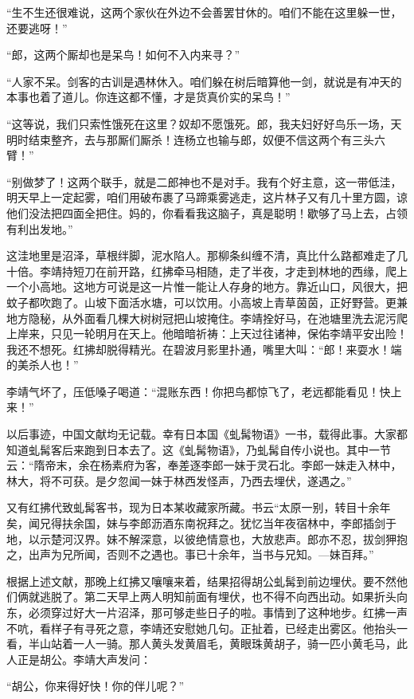 “生不生还很难说，这两个家伙在外边不会善罢甘休的。咱们不能在这里躲一世，还要逃呀！”

“郎，这两个厮却也是呆鸟！如何不入内来寻？”

“人家不呆。剑客的古训是遇林休入。咱们躲在树后暗算他一剑，就说是有冲天的本事也着了道儿。你连这都不懂，才是货真价实的呆鸟！”

“这等说，我们只索性饿死在这里？奴却不愿饿死。郎，我夫妇好好鸟乐一场，天明时结束整齐，去与那厮们厮杀！连杨立也输与郎，奴便不信这两个有三头六臂！”

“别做梦了！这两个联手，就是二郎神也不是对手。我有个好主意，这一带低洼，明天早上一定起雾，咱们用破布裹了马蹄乘雾逃走，这片林子又有几十里方圆，谅他们没法把四面全把住。妈的，你看看我这脑子，真是聪明！歇够了马上去，占领有利出发地。”

这洼地里是沼泽，草根绊脚，泥水陷人。那柳条纠缠不清，真比什么路都难走了几十倍。李靖持短刀在前开路，红拂牵马相随，走了半夜，才走到林地的西缘，爬上一个小高地。这地方可说是这一片惟一能让人存身的地方。靠近山口，风很大，把蚊子都吹跑了。山坡下面活水塘，可以饮用。小高坡上青草茵茵，正好野营。更兼地方隐秘，从外面看几棵大树树冠把山坡掩住。李靖拴好马，在池塘里洗去泥污爬上岸来，只见一轮明月在天上。他暗暗祈祷：上天过往诸神，保佑李靖平安出险！我还不想死。红拂却脱得精光。在碧波月影里扑通，嘴里大叫：“郎！来耍水！端的美杀人也！”

李靖气坏了，压低嗓子喝道：“混账东西！你把鸟都惊飞了，老远都能看见！快上来！”

以后事迹，中国文献均无记载。幸有日本国《虬髯物语》一书，载得此事。大家都知道虬髯客后来跑到日本去了。这《虬髯物语》，乃虬髯自传小说也。其中一节云：“隋帝末，余在杨素府为客，奉差逐李郎一妹于灵石北。李郎一妹走入林中，林大，将不可获。是夕忽闻一妹于林西发怪声，乃西去埋伏，遂遇之。”

又有红拂代致虬髯客书，现为日本某收藏家所藏。书云“太原一别，转目十余年矣，闻兄得扶余国，妹与李郎沥酒东南祝拜之。犹忆当年夜宿林中，李郎插剑于地，以示楚河汉界。妹不解深意，以彼绝情意也，大放悲声。郎亦不忍，拔剑狎抱之，出声为兄所闻，否则不之遇也。事已十余年，当书与兄知。—妹百拜。”

根据上述文献，那晚上红拂又嚷嚷来着，结果招得胡公虬髯到前边埋伏。要不然他们俩就逃脱了。第二天早上两人明知前面有埋伏，也不得不向西出动。如果折头向东，必须穿过好大一片沼泽，那可够走些日子的啦。事情到了这种地步。红拂一声不吭，看样子有寻死之意，李靖还安慰她几句。正扯着，已经走出雾区。他抬头一看，半山站着一人一骑。那人黄头发黄眉毛，黄眼珠黄胡子，骑一匹小黄毛马，此人正是胡公。李靖大声发问：

“胡公，你来得好快！你的伴儿呢？”

